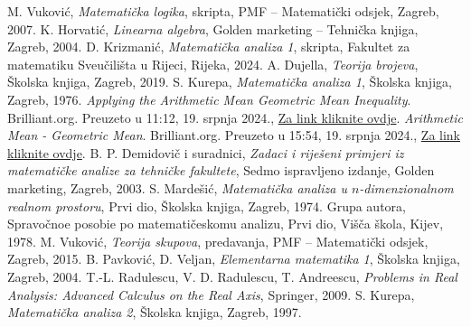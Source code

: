 \documentclass{book}
\theoremstyle{definition}
\theoremstyle{definition}
\theoremstyle{remark}
\begin{document}
\begin{thebibliography}{9}
M. Vuković, \textit{Matematička logika}, skripta, PMF -- Matematički odsjek, Zagreb, 2007.
K. Horvatić, \textit{Linearna algebra}, Golden marketing -- Tehnička knjiga, Zagreb, 2004.
D. Krizmanić, \textit{Matematička analiza 1}, skripta, Fakultet za matematiku Sveučilišta u Rijeci, Rijeka, 2024.
A. Dujella, \textit{Teorija brojeva}, Školska knjiga, Zagreb, 2019.
S. Kurepa, \textit{Matematička analiza 1}, Školska knjiga, Zagreb, 1976.
\textit{Applying the Arithmetic Mean Geometric Mean Inequality}. Brilliant.org. Preuzeto u 11:12, 19. srpnja 2024., \href{https://brilliant.org/wiki/applying-the-arithmetic-mean-geometric-mean/}{Za link kliknite ovdje}.
\textit{Arithmetic Mean - Geometric Mean}. Brilliant.org. Preuzeto u 15:54, 19. srpnja 2024., \href{https://brilliant.org/wiki/arithmetic-mean-geometric-mean/}{Za link kliknite ovdje}.
B. P. Demidovič i suradnici, \textit{Zadaci i riješeni primjeri iz matematičke analize za tehničke fakultete}, Sedmo ispravljeno izdanje, Golden marketing, Zagreb, 2003.
 S. Mardešić, \textit{Matematička analiza u $n$-dimenzionalnom realnom prostoru}, Prvi dio, Školska knjiga, Zagreb, 1974.
 Grupa autora, \foreignlanguage{russian}{Spravočnoe posobie po matematičeskomu analizu, Prvi dio, Višča škola, Kijev, 1978.}
 M. Vuković, \textit{Teorija skupova}, predavanja, PMF -- Matematički odsjek, Zagreb, 2015.
 B. Pavković, D. Veljan, \textit{Elementarna matematika 1}, Školska knjiga, Zagreb, 2004.
 T.-L. Radulescu, V. D. Radulescu, T. Andreescu, \textit{Problems in Real Analysis: Advanced Calculus on the Real Axis}, Springer, 2009.
 S. Kurepa, \textit{Matematička analiza 2}, Školska knjiga, Zagreb, 1997.
\end{thebibliography}
\end{document}
